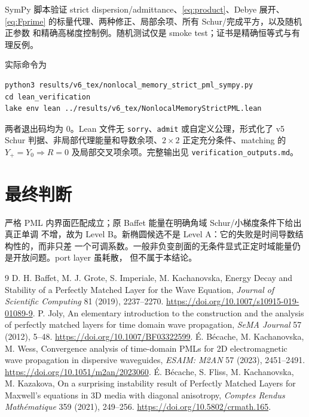 \documentclass[UTF8,a4paper,11pt]{ctexart}
\begin{document}
SymPy 脚本验证 strict dispersion/admittance、\eqref{eq:product}、Debye 展开、
\eqref{eq:Fprime} 的标量代理、两种修正、局部余项、所有 Schur/完成平方，以及随机正参数
和精确高梯度控制例。随机测试仅是 smoke test；证书是精确恒等式与有理反例。

实际命令为
\begin{verbatim}
python3 results/v6_tex/nonlocal_memory_strict_pml_sympy.py
cd lean_verification
lake env lean ../results/v6_tex/NonlocalMemoryStrictPML.lean
\end{verbatim}
两者退出码均为 0。Lean 文件无 \texttt{sorry}、\texttt{admit} 或自定义公理，形式化了
v5 Schur 判据、非局部代理能量和导数余项、$2\times2$ 正定充分条件、matching 的
$Y_+=Y_0\Rightarrow R=0$ 及局部交叉项余项。完整输出见
\texttt{verification\_outputs.md}。

\section{最终判断}

严格 PML 内界面匹配成立；原 Baffet 能量在明确角域 Schur/小梯度条件下给出真正单调
不增，故为 Level B。新椭圆候选不是 Level A：它的失败是时间导数结构性的，而非只差
一个可调系数。一般非负变剖面的无条件显式正定时域能量仍是开放问题。port layer 虽耗散，
但不属于本结论。

\begin{thebibliography}{9}
D. H. Baffet, M. J. Grote, S. Imperiale, M. Kachanovska,
Energy Decay and Stability of a Perfectly Matched Layer for the Wave Equation,
\emph{Journal of Scientific Computing} 81 (2019), 2237--2270.
\url{https://doi.org/10.1007/s10915-019-01089-9}.
P. Joly, An elementary introduction to the construction and the analysis of perfectly matched
layers for time domain wave propagation, \emph{SeMA Journal} 57 (2012), 5--48.
\url{https://doi.org/10.1007/BF03322599}.
É. Bécache, M. Kachanovska, M. Wess,
Convergence analysis of time-domain PMLs for 2D electromagnetic wave propagation in dispersive
waveguides, \emph{ESAIM: M2AN} 57 (2023), 2451--2491.
\url{https://doi.org/10.1051/m2an/2023060}.
É. Bécache, S. Fliss, M. Kachanovska, M. Kazakova,
On a surprising instability result of Perfectly Matched Layers for Maxwell's equations in 3D media
with diagonal anisotropy, \emph{Comptes Rendus Mathématique} 359 (2021), 249--256.
\url{https://doi.org/10.5802/crmath.165}.
\end{thebibliography}
\end{document}
